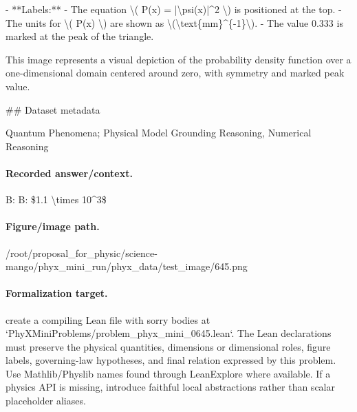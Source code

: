 - **Labels:**
  - The equation \textbackslash{}( P(x) = |\textbackslash{}psi(x)|\textasciicircum{}2 \textbackslash{}) is positioned at the top.
  - The units for \textbackslash{}( P(x) \textbackslash{}) are shown as \textbackslash{}(\textbackslash{}text\{mm\}\textasciicircum{}\{-1\}\textbackslash{}).
  - The value 0.333 is marked at the peak of the triangle.

This image represents a visual depiction of the probability density function over a one-dimensional domain centered around zero, with symmetry and marked peak value.

\#\# Dataset metadata

Quantum Phenomena; Physical Model Grounding Reasoning, Numerical Reasoning

\paragraph{Recorded answer/context.}
B: B: \$1.1 \textbackslash{}times 10\textasciicircum{}3\$

\paragraph{Figure/image path.}
/root/proposal\_for\_physic/science-mango/phyx\_mini\_run/phyx\_data/test\_image/645.png

\paragraph{Formalization target.}
create a compiling Lean file with sorry bodies at `PhyXMiniProblems/problem\_phyx\_mini\_0645.lean`. The Lean declarations must preserve the physical quantities, dimensions or dimensional roles, figure labels, governing-law hypotheses, and final relation expressed by this problem.
Use Mathlib/Physlib names found through LeanExplore where available. If a physics API is missing, introduce faithful local abstractions rather than scalar placeholder aliases.

